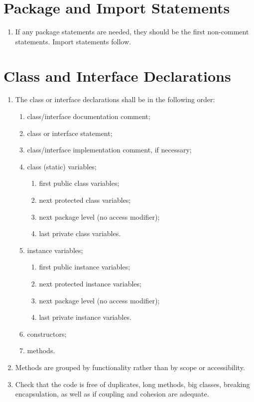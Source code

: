 \documentclass{scrreprt}
\begin{document}
\begin{appendix}
\section*{Package and Import Statements}\begin{enumerate}[resume]
\item If any package statements are needed, they should be the first non-comment statements. Import statements follow.
\end{enumerate}

\section*{Class and Interface Declarations}\begin{enumerate}[resume]
\item The class or interface declarations shall be in the following order:
	\begin{enumerate}
		\item class/interface documentation comment;
		\item class or interface statement;
		\item class/interface implementation comment, if necessary;
		\item class (static) variables;
		\begin{enumerate}
			\item first public class variables;
			\item next protected class variables;
			\item next package level (no access modifier);
			\item last private class variables.
		\end{enumerate}
		\item instance variables;
		\begin{enumerate}
			\item first public instance variables;
			\item next protected instance variables;
			\item next package level (no access modifier);
			\item last private instance variables.
		\end{enumerate}
		\item constructors;
		\item methods.
	\end{enumerate}
	\item Methods are grouped by functionality rather than by scope or accessibility.
	\item Check that the code is free of duplicates, long methods, big classes, breaking encapsulation, as well as if coupling and cohesion are adequate.
\end{enumerate}


\end{appendix}
\end{document}
